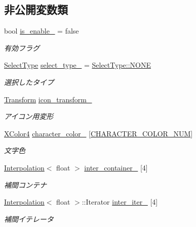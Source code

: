 \subsection*{非公開変数類}
\begin{DoxyCompactItemize}
\item 
bool \mbox{\hyperlink{class_pause_a60151b941654da4a277df4082cc39588}{is\+\_\+enable\+\_\+}} = false
\begin{DoxyCompactList}\small\item\em 有効フラグ \end{DoxyCompactList}\item 
\mbox{\hyperlink{class_pause_a13a552c560a41cf0b17cbef35f8fece7}{Select\+Type}} \mbox{\hyperlink{class_pause_a15222e6a2aa9e359850e54edc3336cc0}{select\+\_\+type\+\_\+}} = \mbox{\hyperlink{class_pause_a13a552c560a41cf0b17cbef35f8fece7ab50339a10e1de285ac99d4c3990b8693}{Select\+Type\+::\+N\+O\+NE}}
\begin{DoxyCompactList}\small\item\em 選択したタイプ \end{DoxyCompactList}\item 
\mbox{\hyperlink{class_transform}{Transform}} \mbox{\hyperlink{class_pause_a8c3cdf04bc62da97b7d3cd3181e0d106}{icon\+\_\+transform\+\_\+}}
\begin{DoxyCompactList}\small\item\em アイコン用変形 \end{DoxyCompactList}\item 
\mbox{\hyperlink{_vector3_d_8h_a680c30c4a07d86fe763c7e01169cd6cc}{X\+Color4}} \mbox{\hyperlink{class_pause_ac930b4189cb78f16dfa388ae32ebc1e3}{character\+\_\+color\+\_\+}} \mbox{[}\mbox{\hyperlink{class_pause_a1f0cde57b638afcbe97baa0c0cbd6229}{C\+H\+A\+R\+A\+C\+T\+E\+R\+\_\+\+C\+O\+L\+O\+R\+\_\+\+N\+UM}}\mbox{]}
\begin{DoxyCompactList}\small\item\em 文字色 \end{DoxyCompactList}\item 
\mbox{\hyperlink{class_interpolation}{Interpolation}}$<$ float $>$ \mbox{\hyperlink{class_pause_a75682108df2d095cc62c0106cc9a913b}{inter\+\_\+container\+\_\+}} \mbox{[}4\mbox{]}
\begin{DoxyCompactList}\small\item\em 補間コンテナ \end{DoxyCompactList}\item 
\mbox{\hyperlink{class_interpolation}{Interpolation}}$<$ float $>$\+::Iterator \mbox{\hyperlink{class_pause_ad99a99f12949db21eae5cfdaf75b79e6}{inter\+\_\+iter\+\_\+}} \mbox{[}4\mbox{]}
\begin{DoxyCompactList}\small\item\em 補間イテレータ \end{DoxyCompactList}\end{DoxyCompactItemize}
